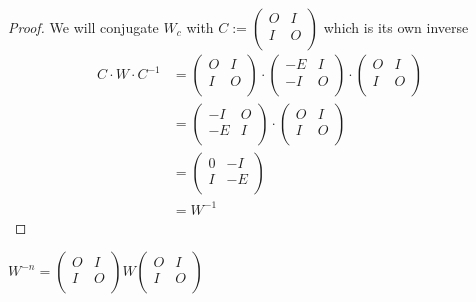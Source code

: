 \begin{proof}
  We will conjugate $W_{c}$ with
  $C := \left(\begin{smallmatrix} O & I \\ I & O \\\end{smallmatrix}\right)$
  which is its own inverse
  \[
  \begin{aligned}
  C \cdot W \cdot C^{-1}
  & =
  \left(
  \begin{array}{cc}
    O & I \\
    I & O \\
  \end{array}
  \right)
  \cdot
  \left(
  \begin{array}{cc}
    -E & I \\
    -I & O \\
  \end{array}
  \right)
  \cdot
  \left(
  \begin{array}{cc}
    O & I \\
    I & O \\
  \end{array}
  \right) \\
  & =
  \left(
  \begin{array}{cc}
    -I & O \\
    -E & I \\
  \end{array}
  \right)
  \cdot
  \left(
  \begin{array}{cc}
    O & I \\
    I & O \\
  \end{array}
  \right) \\
  & =
  \left(
  \begin{array}{cc}
    0 & -I \\
    I & -E \\
  \end{array}
  \right) \\
  & =
  W^{-1}
  \end{aligned}
  \]
\end{proof}

\begin{corollary}
  $W^{-n} =
  \left(\begin{smallmatrix} O & I \\ I & O \\\end{smallmatrix}\right)
  W
  \left(\begin{smallmatrix} O & I \\ I & O \\\end{smallmatrix}\right)$
\end{corollary}

